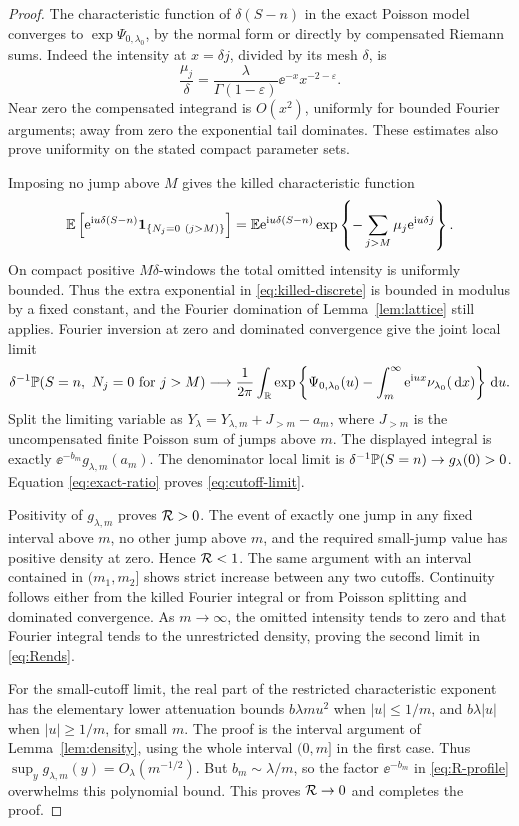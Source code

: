 \documentclass[11pt,a4paper]{article}
\numberwithin{equation}{section}
\theoremstyle{definition}
\theoremstyle{remark}
\newcommand{\R}{\mathbb R}\newcommand{\C}{\mathbb C}
\newcommand{\dd}{\,\mathrm d}\newcommand{\ii}{\mathrm i}
\newcommand{\ep}{\varepsilon}\newcommand{\la}{\lambda}
\begin{document}
\begin{proof}
The characteristic function of \(\delta(S-n)\) in the exact Poisson
model converges to \(\exp\Psi_{0,\la_0}\), by the normal form or directly
by compensated Riemann sums. Indeed the intensity at \(x=\delta j\),
divided by its mesh \(\delta\), is
\[
 \frac{\mu_j}{\delta}
 =\frac\la{\Gamma(1-\ep)}\ee^{-x}x^{-2-\ep}.
\]
Near zero the compensated integrand is \(O(x^2)\), uniformly for
bounded Fourier arguments; away from zero the exponential tail dominates.
These estimates also prove uniformity on the stated compact parameter
sets.

Imposing no jump above \(M\) gives the killed characteristic function
\begin{equation}\label{eq:killed-discrete}
 \E\left[\ee^{\ii u\delta(S-n)}
           \mathbf1_{\{N_j=0\ (j>M)\}}\right]
 =\E\ee^{\ii u\delta(S-n)}
        \exp\left\{-\sum_{j>M}\mu_j\ee^{\ii u\delta j}\right\}.
\end{equation}
On compact positive \(M\delta\)-windows the total omitted intensity is
uniformly bounded. Thus the extra exponential in
\eqref{eq:killed-discrete} is bounded in modulus by a fixed constant,
and the Fourier domination of Lemma~\ref{lem:lattice} still applies.
Fourier inversion at zero and dominated convergence give the joint local
limit
\[
 \delta^{-1}\Prob(S=n,\ N_j=0\text{ for }j>M)
 \longrightarrow\frac1{2\pi}\int_\R
     \exp\left\{\Psi_{0,\la_0}(u)
          -\int_m^\infty\ee^{\ii ux}\nu_{\la_0}(\dd x)\right\}\dd u.
\]
Split the limiting variable as
\(Y_\la=Y_{\la,m}+J_{>m}-a_m\), where \(J_{>m}\) is the
uncompensated finite Poisson sum of jumps above \(m\).
The displayed integral is exactly
\(\ee^{-b_m}g_{\la,m}(a_m)\). The denominator local limit is
\(\delta^{-1}\Prob(S=n)\to g_\la(0)>0\).
Equation \eqref{eq:exact-ratio} proves \eqref{eq:cutoff-limit}.

Positivity of \(g_{\la,m}\) proves \(\mathcal R>0\). The event of exactly one
jump in any fixed interval above \(m\), no other jump above \(m\), and
the required small-jump value has positive density at zero. Hence
\(\mathcal R<1\). The same argument with an interval contained in
\((m_1,m_2]\) shows strict increase between any two cutoffs.
Continuity follows either from the killed Fourier integral or from
Poisson splitting and dominated convergence. As \(m\to\infty\), the
omitted intensity tends to zero and that Fourier integral tends to the
unrestricted density, proving the second limit in \eqref{eq:Rends}.

For the small-cutoff limit, the real part of the restricted characteristic
exponent has the elementary lower attenuation bounds
\(b\la m u^2\) when \(|u|\le1/m\), and \(b\la|u|\) when
\(|u|\ge1/m\), for small \(m\). The proof is the interval argument
of Lemma~\ref{lem:density}, using the whole interval \((0,m]\) in the
first case. Thus \(\sup_y g_{\la,m}(y)=O_\la(m^{-1/2})\).
But \(b_m\sim\la/m\), so the factor \(\ee^{-b_m}\) in
\eqref{eq:R-profile} overwhelms this polynomial bound. This proves
\(\mathcal R\to0\) and completes the proof.
\end{proof}
\end{document}
